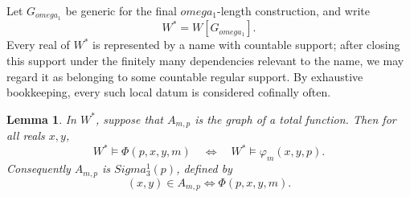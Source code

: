\documentclass{article}
\newtheorem{lemma}[theorem]{Lemma}
\theoremstyle{remark}
\theoremstyle{plain}
\def\Sigma{Sigma}%
\def\omega{omega}%
\begin{document}
Let $G_{\omega_1}$ be generic for the final $\omega_1$-length construction, and
write
\[
   W^*=W[G_{\omega_1}].
\]
Every real of $W^*$ is represented by a name with countable support; after
closing this support under the finitely many dependencies relevant to the name,
we may regard it as belonging to some countable regular support. By exhaustive
bookkeeping, every such local datum is considered cofinally often.

\begin{lemma}\label{lem:no-junk}
In $W^*$, suppose that $A_{m,p}$ is the graph of a total function. Then for all
reals $x,y$,
\[
   W^*\models\Phi(p,x,y,m)
   \quad\Longleftrightarrow\quad
   W^*\models\varphi_m(x,y,p).
\]
Consequently $A_{m,p}$ is $\Sigma^1_3(p)$, defined by
\[
   (x,y)\in A_{m,p}\iff \Phi(p,x,y,m).
\]
\end{lemma}
\end{document}
